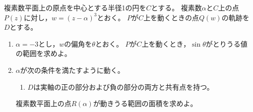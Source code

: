 \documentclass[../../main.tex]{subfiles}
\begin{document}
複素数平面上の原点を中心とする半径1の円を$C$とする。
複素数$\alpha$と$C$上の点$P(z)$に対し，$w={ (z-\alpha) }^3$とおく。
$P$が$C$上を動くときの点$Q(w)$の軌跡を$D$とする。
\begin{enumerate}
  \item$\alpha=-3$とし，$w$の偏角を$\theta$とおく。
    $P$が$C$上を動くとき，$\sin\theta$がとりうる値の範囲を求めよ。
  \item$\alpha$が次の条件を満たすように動く。
    \begin{enumerate}
      \item[条件：]$D$は実軸の正の部分および負の部分の両方と共有点を持つ。
    \end{enumerate}
    複素数平面上の点$R(\alpha)$が動きうる範囲の面積を求めよ。
\end{enumerate}
\end{document}
